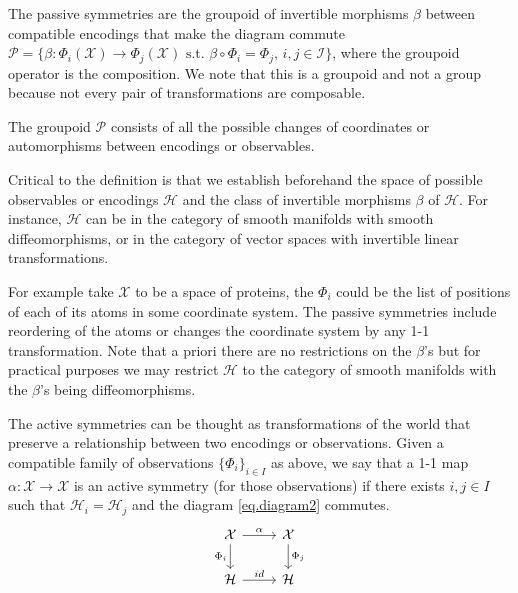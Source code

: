 \documentclass{article}
\theoremstyle{plain}
\theoremstyle{definition}
\theoremstyle{remark}
\begin{document}

The passive symmetries are the groupoid of invertible morphisms $\beta$ between compatible encodings that make the diagram commute $\mathcal P = \{\beta: \Phi_i(\mathcal X) \to \Phi_j(\mathcal X) \text{ s.t. } \beta\circ \Phi_i = \Phi_j, \, i,j\in \mathcal I \}$, where the groupoid operator is the composition. We note that this is a groupoid and not a group because not every pair of transformations are composable. 

The groupoid $\mathcal P$ consists of all the possible changes of coordinates or automorphisms between encodings or observables.

Critical to the definition is that we establish beforehand the space of possible observables or encodings $\mathcal H$ and the class of invertible morphisms $\beta$ of $\mathcal H$. For instance, $\mathcal H$ can be in the category of smooth manifolds with smooth diffeomorphisms, or in the category of vector spaces with invertible linear transformations.   

For example take $\mathcal X$ to be a space of proteins, the $\Phi_i$  could be the list of positions of each of its atoms in some coordinate system. The passive symmetries include reordering of the atoms or changes the coordinate system by any 1-1 transformation. Note that a priori there are no restrictions on the $\beta$'s but for practical purposes we may restrict $\mathcal H$ to the category of smooth manifolds with the $\beta$'s being diffeomorphisms.  

The active symmetries can be thought as transformations of the world that preserve a relationship between two encodings or observations. Given a compatible family of observations $\{\Phi_i\}_{i\in I}$ as above, we say that a 1-1 map $\alpha:\mathcal X \to \mathcal X$ is an active symmetry (for those observations) if there exists $i,j\in I$ such that $\mathcal H_i = \mathcal H_j$ and the diagram  \eqref{eq.diagram2} commutes. 
\begin{equation}\label{eq.diagram2}
\begin{tikzcd}[]
  {\cal X}\arrow[r,"\alpha"] \arrow[d,"\Phi_i",swap] & {\cal X}  \arrow[d,"\Phi_j"]\\
{\mathcal H} \arrow[r,"id"]  & {\mathcal H} 
\end{tikzcd}
\end{equation}
\end{document}

